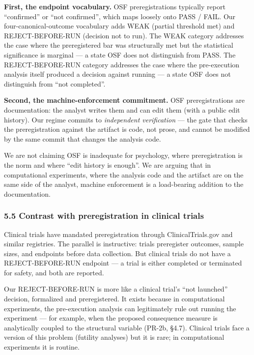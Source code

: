 \documentclass[
]{article}
\begin{document}
\textbf{First, the endpoint vocabulary.} OSF preregistrations typically
report ``confirmed'' or ``not confirmed'', which maps loosely onto PASS
/ FAIL. Our four-canonical-outcome vocabulary adds WEAK (partial
threshold met) and REJECT-BEFORE-RUN (decision not to run). The WEAK
category addresses the case where the preregistered bar was structurally
met but the statistical significance is marginal --- a state OSF does
not distinguish from PASS. The REJECT-BEFORE-RUN category addresses the
case where the pre-execution analysis itself produced a decision against
running --- a state OSF does not distinguish from ``not completed''.

\textbf{Second, the machine-enforcement commitment.} OSF
preregistrations are documentation: the analyst writes them and can edit
them (with a public edit history). Our regime commits to
\emph{independent verification} --- the gate that checks the
preregistration against the artifact is code, not prose, and cannot be
modified by the same commit that changes the analysis code.

We are not claiming OSF is inadequate for psychology, where
preregistration is the norm and where ``edit history is enough''. We are
arguing that in computational experiments, where the analysis code and
the artifact are on the same side of the analyst, machine enforcement is
a load-bearing addition to the documentation.

\subsubsection{5.5 Contrast with preregistration in clinical
trials}\label{contrast-with-preregistration-in-clinical-trials}

Clinical trials have mandated preregistration through ClinicalTrials.gov
and similar registries. The parallel is instructive: trials preregister
outcomes, sample sizes, and endpoints before data collection. But
clinical trials do not have a REJECT-BEFORE-RUN endpoint --- a trial is
either completed or terminated for safety, and both are reported.

Our REJECT-BEFORE-RUN is more like a clinical trial's ``not launched''
decision, formalized and preregistered. It exists because in
computational experiments, the pre-execution analysis can legitimately
rule out running the experiment --- for example, when the proposed
consequence measure is analytically coupled to the structural variable
(PR-2b, §4.7). Clinical trials face a version of this problem (futility
analyses) but it is rare; in computational experiments it is routine.
\end{document}
